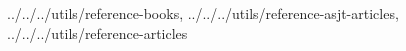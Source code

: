 \nocite{Bar89, BGR14, CL22-clase2, TD23-clase2, Lul16}



{
    ../../../utils/reference-books,
    ../../../utils/reference-asjt-articles,
    ../../../utils/reference-articles
}
\vspace{8mm}

